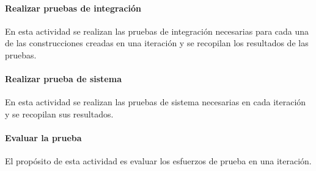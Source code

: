 \paragraph{Realizar pruebas de integración}
En esta actividad se realizan las pruebas de integración necesarias para cada una de las construcciones creadas en una iteración y se recopilan los resultados de las pruebas.
\paragraph{Realizar prueba de sistema}
En esta actividad se realizan las pruebas de sistema necesarias en cada iteración y se recopilan sus resultados.
\paragraph{Evaluar la prueba}
El propósito de esta actividad es evaluar los esfuerzos de prueba en una iteración.
